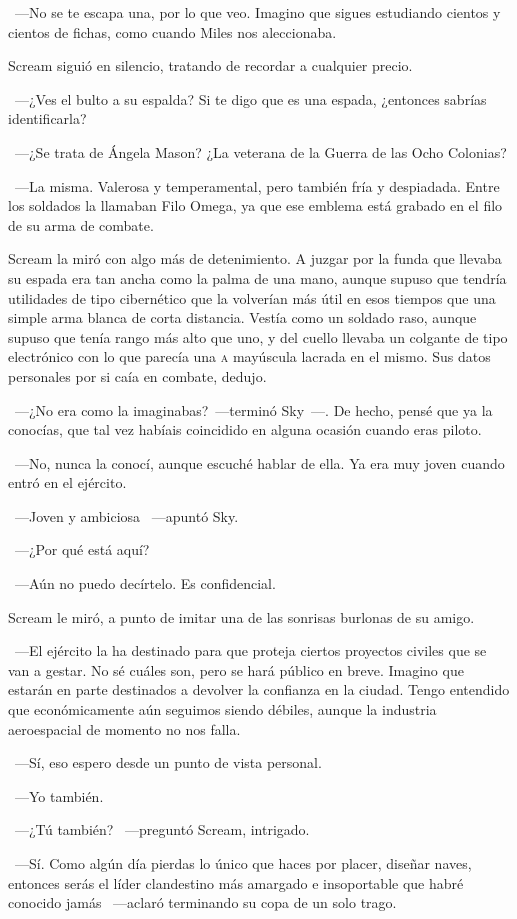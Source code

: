 ~---No se te escapa una, por lo que veo. Imagino que sigues estudiando cientos y cientos de fichas, como cuando Miles nos aleccionaba.

Scream siguió en silencio, tratando de recordar a cualquier precio.

~---¿Ves el bulto a su espalda? Si te digo que es una espada, ¿entonces sabrías identificarla?

~---¿Se trata de Ángela Mason? ¿La veterana de la Guerra de las Ocho Colonias?

~---La misma. Valerosa y temperamental, pero también fría y despiadada. Entre los soldados la llamaban Filo Omega, ya que ese emblema está grabado en el filo de su arma de combate.

Scream la miró con algo más de detenimiento. A juzgar por la funda que llevaba su espada era tan ancha como la palma de una mano, aunque supuso que tendría utilidades de tipo cibernético que la volverían más útil en esos tiempos que una simple arma blanca de corta distancia. Vestía como un soldado raso, aunque supuso que tenía rango más alto que uno, y del cuello llevaba un colgante de tipo electrónico con lo que parecía una \textsc{a} mayúscula lacrada en el mismo. Sus datos personales por si caía en combate, dedujo.

~---¿No era como la imaginabas?~---terminó Sky~---. De hecho, pensé que ya la conocías, que tal vez habíais coincidido en alguna ocasión cuando eras piloto.

~---No, nunca la conocí, aunque escuché hablar de ella. Ya era muy joven cuando entró en el ejército.

~---Joven y ambiciosa ~---apuntó Sky.

~---¿Por qué está aquí?

~---Aún no puedo decírtelo. Es confidencial.

Scream le miró, a punto de imitar una de las sonrisas burlonas de su amigo.

~---El ejército la ha destinado para que proteja ciertos proyectos civiles que se van a gestar. No sé cuáles son, pero se hará público en breve. Imagino que estarán en parte destinados a devolver la confianza en la ciudad. Tengo entendido que económicamente aún seguimos siendo débiles, aunque la industria aeroespacial de momento no nos falla.

~---Sí, eso espero desde un punto de vista personal.

~---Yo también.

~---¿Tú también? ~---preguntó Scream, intrigado.

~---Sí. Como algún día pierdas lo único que haces por placer, diseñar naves, entonces serás el líder clandestino más amargado e insoportable que habré conocido jamás ~---aclaró terminando su copa de un solo trago.

\endinput
